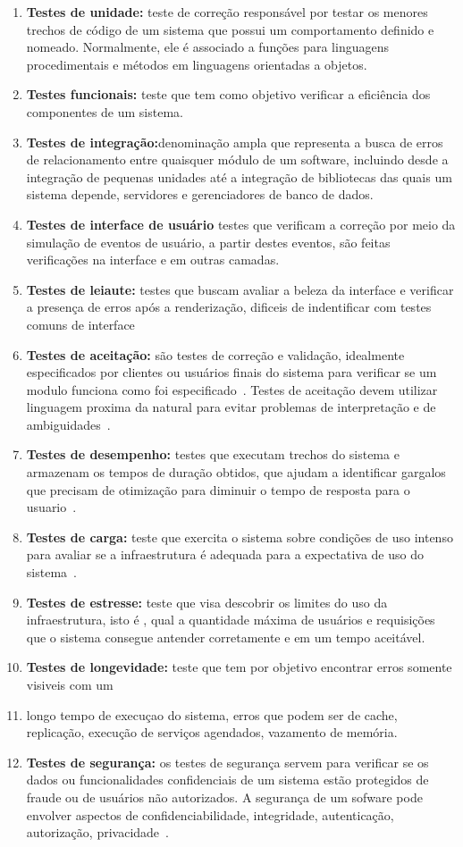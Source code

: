 \begin{enumerate}

\item \textbf{Testes de unidade:} teste de correção responsável por testar os 
menores trechos de código de um sistema que possui um comportamento definido e 
nomeado.
%
Normalmente, ele é associado a funções para linguagens procedimentais e métodos em 
linguagens orientadas a objetos.
\item \textbf{Testes funcionais:} teste que tem como objetivo verificar a eficiência
dos componentes de um sistema.~\cite{molinari2003}
\item \textbf{Testes de integração:}denominação ampla que representa a busca de 
erros de relacionamento entre quaisquer módulo de um software, incluindo desde 
a integração de pequenas unidades até a integração de bibliotecas das quais um 
sistema depende, servidores e gerenciadores de banco de dados.
\item \textbf{Testes de interface de usuário} testes que verificam a correção 
por meio da simulação de eventos de usuário, a partir destes eventos, são feitas 
verificações na interface e em outras camadas.
\item \textbf{Testes de leiaute:} testes que buscam avaliar a beleza da interface 
e verificar a presença de erros após a renderização, dificeis de indentificar 
com testes comuns de interface
\item \textbf{Testes de aceitação:} são testes de correção e validação, idealmente 
especificados por clientes ou usuários finais do sistema para verificar se um 
modulo funciona como foi especificado~\cite{martin2005}.
%
Testes de aceitação devem utilizar linguagem proxima da natural para evitar 
problemas de interpretação e de ambiguidades~\cite{cunningham2005}.
\item \textbf{Testes de desempenho:} testes que executam trechos do sistema e 
armazenam os tempos de duração obtidos, que ajudam a identificar gargalos que 
precisam de otimização para diminuir o tempo de resposta  para o usuario~\cite{liu2009}.
\item \textbf{Testes de carga:}  teste que exercita o sistema sobre condições de uso 
intenso para avaliar se a infraestrutura é adequada para a expectativa de uso do 
sistema~\cite{avritze1994}.
\item \textbf{Testes de estresse:} teste que visa descobrir os limites do uso da 
infraestrutura, isto é , qual a quantidade máxima de usuários e requisições que o 
sistema consegue antender corretamente e em um tempo aceitável.
\item \textbf{Testes de longevidade:} teste que tem por objetivo encontrar erros 
somente visiveis com um
\item longo tempo de execuçao do sistema, erros que podem ser de cache, replicação, 
execução de serviços agendados, vazamento de memória.
\item \textbf{Testes de segurança:} os testes de segurança servem para verificar se 
os dados ou funcionalidades confidenciais de um sistema  estão protegidos de fraude 
ou de usuários não autorizados. A segurança de um sofware pode envolver aspectos de 
confidenciabilidade, integridade, autenticação, autorização, privacidade~\cite{whittaker2006}.


\end{enumerate}
